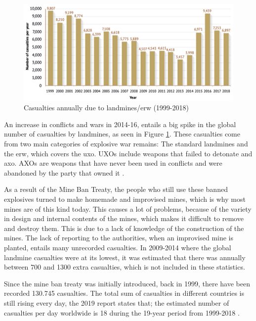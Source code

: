         \vspace{2mm}

\begin{figure}[!ht]
  \centering
  \includegraphics[width=12.5cm]{00 - Images/casualties_per_year.png}
  \caption{Casualties annually due to landmines/\gls{erw} (1999-2018) \cite{LandmineMonitor2019}}
  \label{fig:casualties_per_year}
\end{figure}

\newpage

An increase in conflicts and wars in 2014-16, entails a big spike in the global number of casualties by landmines, as seen in Figure \ref{fig:casualties_per_year}. These casualties come from two main categories of explosive war remains: The standard landmines and the \gls{erw}, which covers the \gls{uxo}. UXOs include weapons that failed to detonate and \gls{axo}. AXOs are weapons that have never been used in conflicts and were abandoned by the party that owned it \cite{Remnants2019:online}. 

        \vspace{2mm}

As a result of the Mine Ban Treaty, the people who still use these banned explosives turned to make homemade and improvised mines, which is why most mines are of this kind today. This causes a lot of problems, because of the variety in design and internal contents of the mines, which makes it difficult to remove and destroy them. This is due to a lack of knowledge of the construction of the mines. The lack of reporting to the authorities, when an improvised mine is planted, entails many unrecorded casualties. In 2009-2014 where the global landmine casualties were at its lowest, it was estimated that there was annually between 700 and 1300 extra casualties, which is not included in these statistics. 

        \vspace{2mm}

Since the mine ban treaty was initially introduced, back in 1999, there have been recorded 130.745 casualties. The total sum of casualties in different countries is still rising every day, the 2019 report states that; the estimated number of casualties per day worldwide is 18 during the 19-year period from 1999-2018 \cite{LandmineMonitor2019}.

